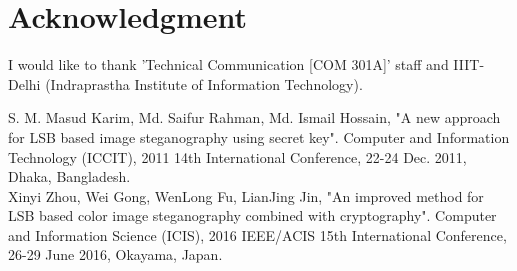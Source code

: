 \documentclass[conference]{IEEEtran}
\begin{document}
\section*{Acknowledgment}
I would like to thank 'Technical Communication [COM 301A]' staff and IIIT-Delhi (Indraprastha Institute of Information Technology).\\

\begin{thebibliography}{00}
 S. M. Masud Karim, Md. Saifur Rahman, Md. Ismail Hossain, "A new approach for LSB based image steganography using secret key".  Computer and Information Technology (ICCIT), 2011 14th International Conference, 22-24 Dec. 2011, Dhaka, Bangladesh.\\
 Xinyi Zhou, Wei Gong, WenLong Fu, LianJing Jin, "An improved method for LSB based color image steganography combined with cryptography". Computer and Information Science (ICIS), 2016 IEEE/ACIS 15th International Conference, 26-29 June 2016, Okayama, Japan.\\
\end{thebibliography}
\end{document}
